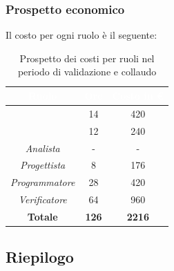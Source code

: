 \subsubsection{Prospetto economico}
Il costo per ogni ruolo è il seguente:
\begin{table}[H]
	\begin{center}
		\begin{tabular}{ |c c c| }
			\rowcolor{darkblue} 
			\textcolor{white}{\textbf{Ruolo}} & \textcolor{white}{\textbf{Ore}} & \textcolor{white}{\textbf{Costo in €}}\\ \hline
			{\Responsabile} 			& 14 	& 420 \\ \hline
			{\Amministratore}		 	& 12 	& 240 \\ \hline
			\textit{Analista} 			& - 	& - \\ \hline
			\textit{Progettista} 		& 8 	& 176 \\ \hline
			\textit{Programmatore}  	& 28 	& 420 \\ \hline
			\textit{Verificatore} 		& 64 	& 960 \\ \hline
			\textbf{Totale} & \textbf{126} & \textbf{2216} \\ \hline
		\end{tabular}
		\caption{Prospetto dei costi per ruoli nel periodo di validazione e collaudo}
	\end{center}
\end{table}
\newpage

\subsection{Riepilogo}

